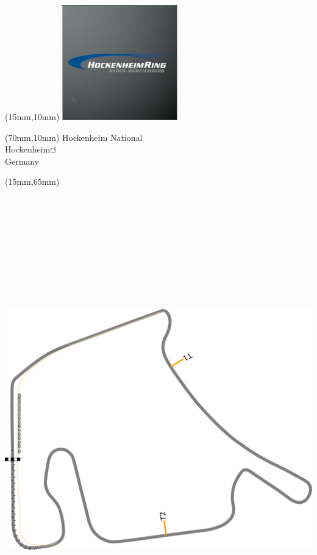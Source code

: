 \null\newpage
\begin{textblock*}{50mm}(15mm,10mm)%
\includegraphics[width=50mm]{LG/2015-05-20_00082.png}
\end{textblock*}
\begin{textblock*}{130mm}(70mm,10mm)%
{\fontsize{20}{20}\selectfont Hockenheim National\\}
{\fontsize{16}{16}\selectfont Hockenheim\hfill \huge$\circlearrowleft$\\}
{\fontsize{12}{12}\selectfont Germany\\}
\end{textblock*}
\begin{textblock*}{185mm}(15mm,65mm)%
\centering
\mbox{\includegraphics[width=185mm,height=210mm,keepaspectratio]{PT/HONA.pdf}}
\end{textblock*}
